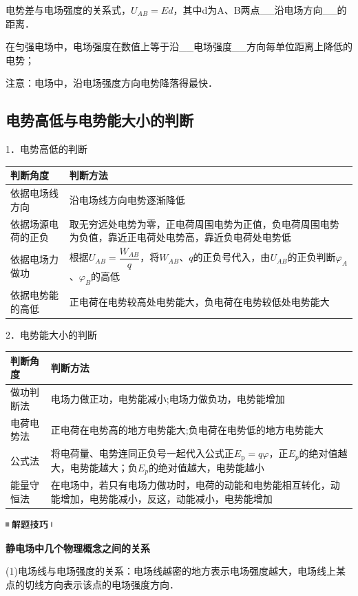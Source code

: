 \documentclass[cn,10.5pt,chinese,mac,chinesefont=founder]{elegantbook}
\begin{document}
电势差与电场强度的关系式，$U_{A B}=E d$，其中d为A、B两点\_\_沿电场方向\_\_的距离．

在匀强电场中，电场强度在数值上等于沿\_\_电场强度\_\_方向每单位距离上降低的电势；

注意：电场中，沿电场强度方向电势降落得最快．


\newpage


\subsection{电势高低与电势能大小的判断}

1．电势高低的判断

\begin{longtable}[]{@{}m{3.5cm}m{11cm}@{}}
\toprule
判断角度 & 判断方法\tabularnewline
\midrule
\endhead
依据电场线方向 & 沿电场线方向电势逐渐降低\tabularnewline
依据场源电荷的正负 &
取无穷远处电势为零，正电荷周围电势为正值，负电荷周围电势为负值，靠近正电荷处电势高，靠近负电荷处电势低\tabularnewline
依据电场力做功 &
根据$U_{A B}=\dfrac{W_{A B}}{q}$，将$W_{A B}$、$q$的正负号代入，由$U_{A B}$的正负判断$\varphi _A$、$\varphi_B$的高低\tabularnewline
依据电势能的高低 &
正电荷在电势较高处电势能大，负电荷在电势较低处电势能大\tabularnewline
\bottomrule
\end{longtable}

2．电势能大小的判断

\begin{longtable}[]{@{}m{2cm}m{13cm}@{}}
\toprule
判断角度 & 判断方法\tabularnewline
\midrule
\endhead
做功判断法&电场力做正功，电势能减小;电场力做负功，电势能增加\tabularnewline
电荷电势法&正电荷在电势高的地方电势能大;负电荷在电势低的地方电势能大\tabularnewline
公式法 &
将电荷量、电势连同正负号一起代入公式正$E_{\mathrm{p}}=q \varphi$，正$E_p$的绝对值越大，电势能越大；负$E_p$的绝对值越大，电势能越小\tabularnewline
能量守恒法 &
在电场中，若只有电场力做功时，电荷的动能和电势能相互转化，动能增加，电势能减小，反这，动能减小，电势能增加\tabularnewline
\bottomrule
\end{longtable}

\begin{center}\includegraphics[width=0.70833in,height=0.125in]{media/image37.png}

\textbf{静电场中几个物理概念之间的关系}
\end{center}


(1)电场线与电场强度的关系：电场线越密的地方表示电场强度越大，电场线上某点的切线方向表示该点的电场强度方向．
\end{document}
